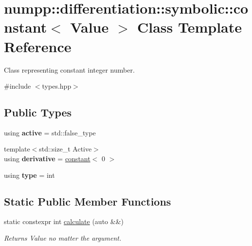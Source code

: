 \hypertarget{classnumpp_1_1differentiation_1_1symbolic_1_1constant}{}\section{numpp\+:\+:differentiation\+:\+:symbolic\+:\+:constant$<$ Value $>$ Class Template Reference}
\label{classnumpp_1_1differentiation_1_1symbolic_1_1constant}


Class representing constant integer number.  




{\ttfamily \#include $<$types.\+hpp$>$}

\subsection*{Public Types}
\begin{DoxyCompactItemize}
\item 
\mbox{\label{classnumpp_1_1differentiation_1_1symbolic_1_1constant_a7982f91c5d93097b33fe2afb414f0c61}} 
using {\bfseries active} = std\+::false\+\_\+type
\item 
\mbox{\label{classnumpp_1_1differentiation_1_1symbolic_1_1constant_a628b3d3d33b013504778e13737b6e591}} 
{\footnotesize template$<$std\+::size\+\_\+t Active$>$ }\\using {\bfseries derivative} = \hyperlink{classnumpp_1_1differentiation_1_1symbolic_1_1constant}{constant}$<$ 0 $>$
\item 
\mbox{\label{classnumpp_1_1differentiation_1_1symbolic_1_1constant_ad66f7cc2920b701bb875a9e88ff41015}} 
using {\bfseries type} = int
\end{DoxyCompactItemize}
\subsection*{Static Public Member Functions}
\begin{DoxyCompactItemize}
\item 
static constexpr int \hyperlink{classnumpp_1_1differentiation_1_1symbolic_1_1constant_a8107c312e0715c40161432bf072fcfa9}{calculate} (auto \&\&)
\begin{DoxyCompactList}\small\item\em Returns Value no matter the argument. \end{DoxyCompactList}\end{DoxyCompactItemize}


